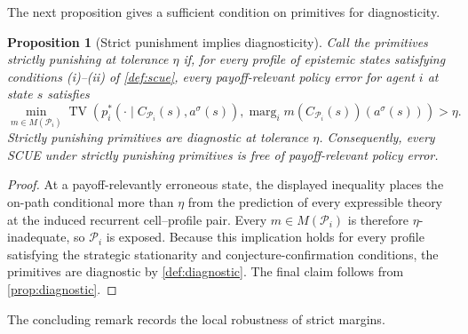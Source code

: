 \documentclass[11pt]{article}
\newtheorem{proposition}[assumption]{Proposition}
\theoremstyle{definition}
\newcommand{\TV}{\operatorname{TV}}
\newcommand{\marg}[1]{\operatorname{marg}_{#1}}
\begin{document}
The next proposition gives a sufficient condition on primitives for diagnosticity.

\begin{proposition}[Strict punishment implies diagnosticity]
\label{prop:punishing}
Call the primitives \emph{strictly punishing at tolerance \(\eta\)} if, for every profile of epistemic states satisfying conditions \emph{(i)}--\emph{(ii)} of \cref{def:scue}, every payoff-relevant policy error for agent \(i\) at state \(s\) satisfies
\[
\min_{m\in M(\mathcal P_i)}
\TV\!\left(
p_i^{*}\!\left(
\cdot\mid
C_{\mathcal P_i}(s),a^{\sigma}(s)
\right),
\marg{i}m(C_{\mathcal P_i}(s))(a^{\sigma}(s))
\right)
>
\eta.
\]
Strictly punishing primitives are diagnostic at tolerance \(\eta\).
Consequently, every SCUE under strictly punishing primitives is free of payoff-relevant policy error.
\end{proposition}

\begin{proof}
At a payoff-relevantly erroneous state, the displayed inequality places the on-path conditional more than \(\eta\) from the prediction of every expressible theory at the induced recurrent cell--profile pair.
Every \(m\in M(\mathcal P_i)\) is therefore \(\eta\)-inadequate, so \(\mathcal P_i\) is exposed.
Because this implication holds for every profile satisfying the strategic stationarity and conjecture-confirmation conditions, the primitives are diagnostic by \cref{def:diagnostic}.
The final claim follows from \cref{prop:diagnostic}.
\end{proof}

The concluding remark records the local robustness of strict margins.
\end{document}
